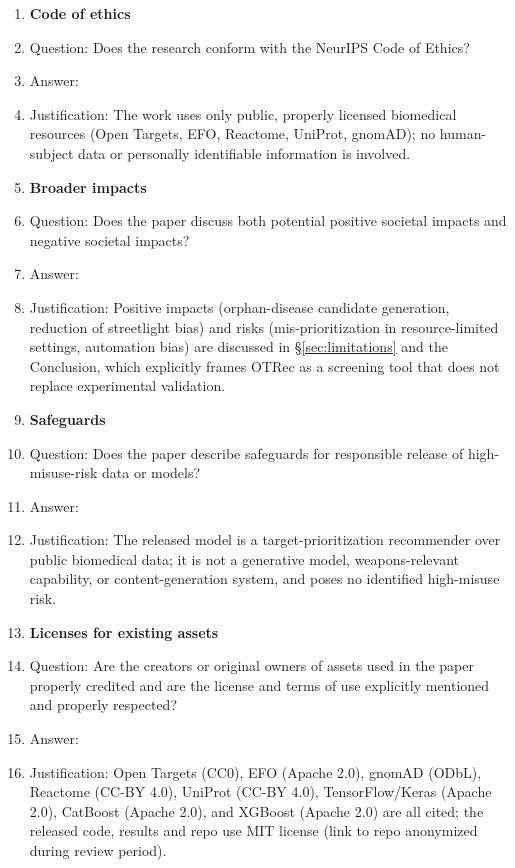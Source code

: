 \begin{enumerate}
\item {\bf Code of ethics}
    \item[] Question: Does the research conform with the NeurIPS Code of Ethics?
    \item[] Answer: \answerYes{}
    \item[] Justification: The work uses only public, properly licensed biomedical resources (Open Targets, EFO, Reactome, UniProt, gnomAD); no human-subject data or personally identifiable information is involved.

\item {\bf Broader impacts}
    \item[] Question: Does the paper discuss both potential positive societal impacts and negative societal impacts?
    \item[] Answer: \answerYes{}
    \item[] Justification: Positive impacts (orphan-disease candidate generation, reduction of streetlight bias) and risks (mis-prioritization in resource-limited settings, automation bias) are discussed in \S\ref{sec:limitations} and the Conclusion, which explicitly frames OTRec as a screening tool that does not replace experimental validation.

\item {\bf Safeguards}
    \item[] Question: Does the paper describe safeguards for responsible release of high-misuse-risk data or models?
    \item[] Answer: \answerNA{}
    \item[] Justification: The released model is a target-prioritization recommender over public biomedical data; it is not a generative model, weapons-relevant capability, or content-generation system, and poses no identified high-misuse risk.

\item {\bf Licenses for existing assets}
    \item[] Question: Are the creators or original owners of assets used in the paper properly credited and are the license and terms of use explicitly mentioned and properly respected?
    \item[] Answer: \answerYes{}
    \item[] Justification: Open Targets (CC0), EFO (Apache 2.0), gnomAD (ODbL), Reactome (CC-BY 4.0), UniProt (CC-BY 4.0), TensorFlow/Keras (Apache 2.0), CatBoost (Apache 2.0), and XGBoost (Apache 2.0) are all cited; the released code, results and repo use MIT license (link to repo anonymized during review period).


\end{enumerate}
